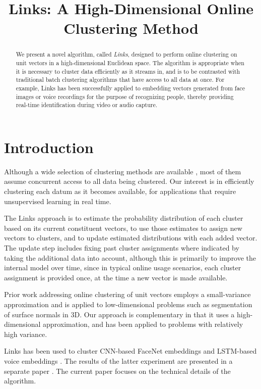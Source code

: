 \documentclass{article}
\title{Links: A High-Dimensional Online Clustering Method}
\begin{document}
\ninept
%
\maketitle
%
\begin{abstract}
We present a novel algorithm, called \textit{Links}, designed to perform online clustering on unit vectors in a high-dimensional Euclidean space. The algorithm is appropriate when it is necessary to cluster data efficiently as it streams in, and is to be contrasted with traditional batch clustering algorithms that have access to all data at once. For example, Links has been successfully applied to embedding vectors generated from face images or voice recordings for the purpose of recognizing people, thereby providing real-time identification during video or audio capture.
\end{abstract}
%
\section{Introduction}
\label{sec:intro}

Although a wide selection of clustering methods are available \cite{everitt2011cluster,hennig2015handbook}, most of them assume concurrent access to all data being clustered.  Our interest is in efficiently clustering each datum as it becomes available, for applications that require unsupervised learning in real time.

The Links approach is to estimate the probability distribution of each cluster based on its current constituent vectors, to use those estimates to assign new vectors to clusters, and to update estimated distributions with each added vector. The update step includes fixing past cluster assignments where indicated by taking the additional data into account, although this is primarily to improve the internal model over time, since in typical online usage scenarios, each cluster assignment is provided once, at the time a new vector is made available.

Prior work \cite{straub2015small} addressing online clustering of unit vectors employs a small-variance approximation and is applied to low-dimensional problems such as segmentation of surface normals in 3D. Our approach is complementary in that it uses a high-dimensional approximation, and has been applied to problems with relatively high variance.

Links has been used to cluster CNN-based FaceNet embeddings \cite{schroff2015facenet} and LSTM-based voice embeddings \cite{wan2017ge2e}. The results of the latter experiment are presented in a separate paper \cite{wang2017speaker}. The current paper focuses on the technical details of the algorithm.
\end{document}
